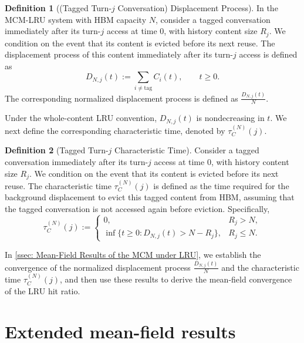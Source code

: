 \documentclass{article}
\theoremstyle{definition}
\newtheorem{definition}[definition]{Definition}
\begin{document}
\begin{definition}[(Tagged Turn-$j$ Conversation) Displacement Process]
    \label{def: tagged-conversation displacement process}
    In the MCM-LRU system with HBM capacity $N$, consider a tagged conversation immediately after its turn-$j$ access at time $0$, with history content size $R_j$.
    We condition on the event that its content is evicted before its next reuse. The displacement process of this content immediately after its turn-$j$ access is defined as
    \begin{equation}
    \label{equ: tagged displacement process}
        D_{N,j}(t):=\sum_{i\neq \mathrm{tag}} C_i(t), \qquad t\geq0.
    \end{equation}
    The corresponding normalized displacement process is defined as $\frac{D_{N,j}(t)}{N}$.
\end{definition}

Under the whole-content LRU convention, $D_{N,j}(t)$ is nondecreasing in $t$. We next define the corresponding characteristic time, denoted by $\tau_C^{(N)}(j)$.


\begin{definition}[Tagged Turn-$j$ Characteristic Time]
    \label{def: characteristic time}
    Consider a tagged conversation immediately after its turn-$j$ access at time $0$, with history content size $R_j$. We condition on the event that its content is evicted before its next reuse. The characteristic time $\tau_C^{(N)}(j)$ is defined as the time required for the background displacement to evict this tagged content from HBM, assuming that the tagged conversation is not accessed again before eviction. Specifically,
    \begin{equation}
    \label{equ: exact characteristic time}
        \tau_C^{(N)}(j):=
        \begin{cases}
            0, & R_j>N, \\
            \inf\{t\geq 0: D_{N,j}(t)>N-R_j\}, & R_j\leq N.
        \end{cases}
    \end{equation}
\end{definition}

In \cref{ssec: Mean-Field Results of the MCM under LRU}, we establish the convergence of the normalized displacement process $\frac{D_{N,j}(t)}{N}$ and the characteristic time $\tau_C^{(N)}(j)$, and then use these results to derive the mean-field convergence of the LRU hit ratio.


\section{Extended mean-field results}
\label{sec: main results}
\end{document}

